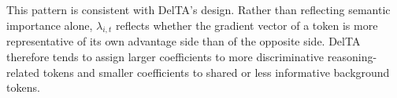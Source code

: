 \documentclass{article} %
\begin{document}
This pattern is consistent with DelTA's design. Rather than reflecting semantic importance alone, \(\lambda_{i,t}\) reflects whether the gradient vector of a token is more representative of its own advantage side than of the opposite side. DelTA therefore tends to assign larger coefficients to more discriminative reasoning-related tokens and smaller coefficients to shared or less informative background tokens.
\end{document}
